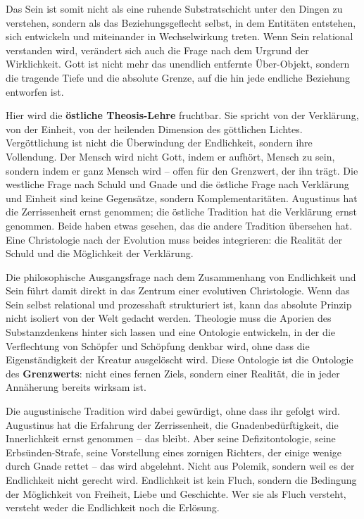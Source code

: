 \documentclass[
  ngerman,
]{article}
\begin{document}
Das Sein ist somit nicht als eine ruhende Substratschicht unter den
Dingen zu verstehen, sondern als das Beziehungsgeflecht selbst, in dem
Entitäten entstehen, sich entwickeln und miteinander in Wechselwirkung
treten. Wenn Sein relational verstanden wird, verändert sich auch die
Frage nach dem Urgrund der Wirklichkeit. Gott ist nicht mehr das
unendlich entfernte Über-Objekt, sondern die tragende Tiefe und die
absolute Grenze, auf die hin jede endliche Beziehung entworfen ist.

Hier wird die \textbf{östliche Theosis-Lehre} fruchtbar. Sie spricht von
der Verklärung, von der Einheit, von der heilenden Dimension des
göttlichen Lichtes. Vergöttlichung ist nicht die Überwindung der
Endlichkeit, sondern ihre Vollendung. Der Mensch wird nicht Gott, indem
er aufhört, Mensch zu sein, sondern indem er ganz Mensch wird -- offen
für den Grenzwert, der ihn trägt. Die westliche Frage nach Schuld und
Gnade und die östliche Frage nach Verklärung und Einheit sind keine
Gegensätze, sondern Komplementaritäten. Augustinus hat die Zerrissenheit
ernst genommen; die östliche Tradition hat die Verklärung ernst
genommen. Beide haben etwas gesehen, das die andere Tradition übersehen
hat. Eine Christologie nach der Evolution muss beides integrieren: die
Realität der Schuld und die Möglichkeit der Verklärung.

Die philosophische Ausgangsfrage nach dem Zusammenhang von Endlichkeit
und Sein führt damit direkt in das Zentrum einer evolutiven
Christologie. Wenn das Sein selbst relational und prozesshaft
strukturiert ist, kann das absolute Prinzip nicht isoliert von der Welt
gedacht werden. Theologie muss die Aporien des Substanzdenkens hinter
sich lassen und eine Ontologie entwickeln, in der die Verflechtung von
Schöpfer und Schöpfung denkbar wird, ohne dass die Eigenständigkeit der
Kreatur ausgelöscht wird. Diese Ontologie ist die Ontologie des
\textbf{Grenzwerts}: nicht eines fernen Ziels, sondern einer Realität,
die in jeder Annäherung bereits wirksam ist.

Die augustinische Tradition wird dabei gewürdigt, ohne dass ihr gefolgt
wird. Augustinus hat die Erfahrung der Zerrissenheit, die
Gnadenbedürftigkeit, die Innerlichkeit ernst genommen -- das bleibt.
Aber seine Defizitontologie, seine Erbsünden-Strafe, seine Vorstellung
eines zornigen Richters, der einige wenige durch Gnade rettet -- das
wird abgelehnt. Nicht aus Polemik, sondern weil es der Endlichkeit nicht
gerecht wird. Endlichkeit ist kein Fluch, sondern die Bedingung der
Möglichkeit von Freiheit, Liebe und Geschichte. Wer sie als Fluch
versteht, versteht weder die Endlichkeit noch die Erlösung.
\end{document}
